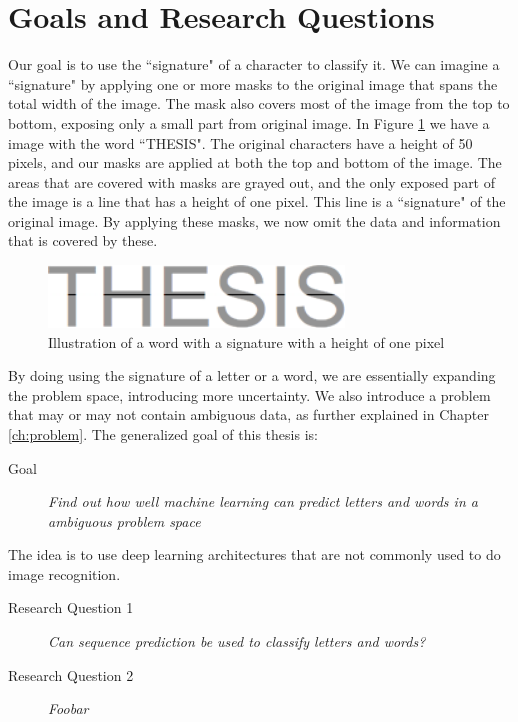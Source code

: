 
\section{Goals and Research Questions}
\label{sec:goals_and_research_questions}
Our goal is to use the ``signature" of a character to classify it. We can imagine a ``signature" by applying one or more masks to the original image that spans the total width of the image. The mask also covers most of the image from the top to bottom, exposing only a small part from original image. In Figure \ref{fig:thesis-signature} we have a image with the word ``THESIS". The original characters have a height of 50 pixels, and our masks are applied at both the top and bottom of the image. The areas that are covered with masks are grayed out, and the only exposed part of the image is a line that has a height of one pixel. This line is a ``signature" of the original image. By applying these masks, we now omit the data and information that is covered by these.

\begin{figure}[ht]
    \centering
    \includegraphics[width=0.7\textwidth]{fig/chapter1/signature.png}
    \caption{Illustration of a word with a signature with a height of one pixel}
    \label{fig:thesis-signature}
\end{figure}

By doing using the signature of a letter or a word, we are essentially expanding the problem space, introducing more uncertainty. We also introduce a problem that may or may not contain ambiguous data, as further explained in Chapter \ref{ch:problem}. The generalized goal of this thesis is:

\begin{description}
\item[Goal] {\textit{Find out how well machine learning can predict letters and words in a ambiguous problem space}}
\end{description}

The idea is to use deep learning architectures that are not commonly used to do image recognition. 

\begin{description}
    \item[Research Question 1]{\textit{Can sequence prediction be used to classify letters and words?}}
    \item[Research Question 2]{\textit{Foobar}}
\end{description}

